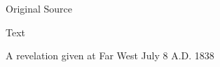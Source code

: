 				
				\begin{description}
					\item[Original Source]
				\end{description}
				
					
				
				\begin{description}
					\item[Text]
				\end{description}
				
					A revelation given at Far West July 8 A.D. 1838

